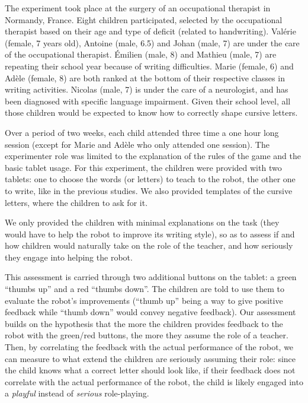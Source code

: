 \documentclass{article}
\begin{document}
The experiment took place at the surgery of an occupational therapist in
Normandy, France. Eight children participated, selected by the occupational
therapist based on their age and type of deficit (related to handwriting).
Valérie (female, 7 years old), Antoine (male, 6.5) and Johan (male, 7) are under
the care of the occupational therapist. Émilien (male, 8) and Mathieu (male, 7)
are repeating their school year because of writing difficulties. Marie (female,
6) and Adèle (female, 8) are both ranked at the bottom of their respective
classes in writing activities. Nicolas (male, 7) is under the care of a
neurologist, and has been diagnosed with specific language impairment. Given
their school level, all those children would be expected to know how to
correctly shape cursive letters. 

Over a period of two weeks, each child attended three time a one hour long
session (except for Marie and Adèle who only attended one session). The
experimenter role was limited to the explanation of the rules of the game and
the basic tablet usage. For this experiment, the children were provided with two
tablets: one to choose the words (or letters) to teach to the robot, the other one
to write, like in the previous studies. We also provided templates of the
cursive letters, where the children to ask for it.

We only provided the children with minimal explanations on the task (they would
have to help the robot to improve its writing style), so as to assess if and how
children would naturally take on the role of the teacher, and how seriously they
engage into helping the robot.

This assessment is carried through two additional buttons on the tablet: a
green ``thumbs up'' and a red ``thumbs down''. The children are told to use
them to evaluate the robot's improvements (``thumb up'' being a way to give
positive feedback while ``thumb down'' would convey negative feedback). Our
assessment builds on the hypothesis that the more the children provides feedback to
the robot with the green/red buttons, the more they assume the role of a
teacher. Then, by correlating the feedback with the actual performance of the
robot, we can measure to what extend the children are seriously assuming their
role: since the child knows what a correct letter should look like, if their
feedback does not correlate with the actual performance of the robot, the child
is likely engaged into a \emph{playful} instead of \emph{serious} role-playing.
\end{document}
